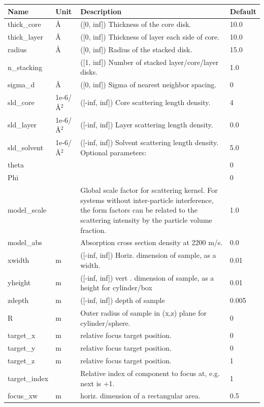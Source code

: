 \begin{longtable}{p{}p{}p{}p{}}
\toprule
\textbf{Name} & \textbf{Unit} & \textbf{Description} & \textbf{Default} \\
\midrule
\endhead
thick\_core & \AA{} & ([0, inf]) Thickness of the core disk. & 10.0 \\
thick\_layer & \AA{} & ([0, inf]) Thickness of layer each side of core. & 10.0 \\
radius & \AA{} & ([0, inf]) Radius of the stacked disk. & 15.0 \\
n\_stacking &  & ([1, inf]) Number of stacked layer/core/layer disks. & 1.0 \\
sigma\_d & \AA{} & ([0, inf]) Sigma of nearest neighbor spacing. & 0 \\
sld\_core & 1e-6/\AA{}$^{2}$ & ([-inf, inf]) Core scattering length density. & 4 \\
sld\_layer & 1e-6/\AA{}$^{2}$ & ([-inf, inf]) Layer scattering length density. & 0.0 \\
sld\_solvent & 1e-6/\AA{}$^{2}$ & ([-inf, inf]) Solvent scattering length density. Optional parameters: & 5.0 \\
theta &  &  & 0 \\
Phi &  &  & 0 \\
model\_scale &   & Global scale factor for scattering kernel. For systems without inter-particle interference, the form factors can be related to the scattering intensity by the particle volume fraction. & 1.0 \\
model\_abs &   & Absorption cross section density at 2200 m/s. & 0.0 \\
xwidth & m & ([-inf, inf]) Horiz. dimension of sample, as a width. & 0.01 \\
yheight & m & ([-inf, inf]) vert . dimension of sample, as a height for cylinder/box & 0.01 \\
zdepth & m & ([-inf, inf]) depth of sample & 0.005 \\
R & m & Outer radius of sample in (x,z) plane for cylinder/sphere. & 0 \\
target\_x & m & relative focus target position. & 0 \\
target\_y & m & relative focus target position. & 0 \\
target\_z & m & relative focus target position. & 1 \\
target\_index &   & Relative index of component to focus at, e.g. next is +1. & 1 \\
focus\_xw & m & horiz. dimension of a rectangular area. & 0.5 \\

\end{longtable}
